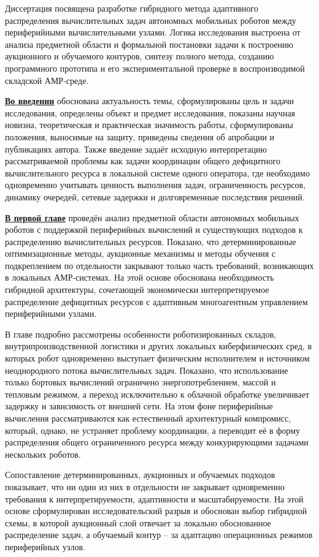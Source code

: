Диссертация посвящена разработке гибридного метода адаптивного распределения
вычислительных задач автономных мобильных роботов между периферийными
вычислительными узлами. Логика исследования выстроена от анализа предметной
области и формальной постановки задачи к построению аукционного и обучаемого
контуров, синтезу полного метода, созданию программного прототипа и его
экспериментальной проверке в воспроизводимой складской АМР-среде.

\underline{\textbf{Во введении}} обоснована актуальность темы, сформулированы
цель и задачи исследования, определены объект и предмет исследования,
показаны научная новизна, теоретическая и практическая значимость работы,
сформулированы положения, выносимые на защиту, приведены сведения об
апробации и публикациях автора. Также введение задаёт исходную интерпретацию
рассматриваемой проблемы как задачи координации общего дефицитного
вычислительного ресурса в локальной системе одного оператора, где необходимо
одновременно учитывать ценность выполнения задач, ограниченность ресурсов,
динамику очередей, сетевые задержки и долговременные последствия решений.

\underline{\textbf{В первой главе}} проведён анализ предметной области
автономных мобильных роботов с поддержкой периферийных вычислений и
существующих подходов к распределению вычислительных ресурсов. Показано, что
детерминированные оптимизационные методы, аукционные механизмы и методы
обучения с подкреплением по отдельности закрывают только часть требований,
возникающих в локальных АМР-системах. На этой основе обоснована необходимость
гибридной архитектуры, сочетающей экономически интерпретируемое распределение
дефицитных ресурсов с адаптивным многоагентным управлением периферийными
узлами.

В главе подробно рассмотрены особенности роботизированных складов,
внутрипроизводственной логистики и других локальных киберфизических сред, в
которых робот одновременно выступает физическим исполнителем и источником
неоднородного потока вычислительных задач. Показано, что использование только
бортовых вычислений ограничено энергопотреблением, массой и тепловым режимом,
а переход исключительно к облачной обработке увеличивает задержку и
зависимость от внешней сети. На этом фоне периферийные вычисления
рассматриваются как естественный архитектурный компромисс, который, однако,
не устраняет проблему координации, а переводит её в форму распределения
общего ограниченного ресурса между конкурирующими задачами нескольких
роботов.

Сопоставление детерминированных, аукционных и обучаемых подходов показывает,
что ни один из них в отдельности не закрывает одновременно требования к
интерпретируемости, адаптивности и масштабируемости. На этой основе
сформулирован исследовательский разрыв и обоснован выбор гибридной схемы, в
которой аукционный слой отвечает за локально обоснованное распределение задач,
а обучаемый контур -- за адаптацию операционных режимов периферийных узлов.

